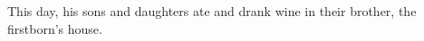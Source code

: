 \begin{inparaenum}
     This day, his sons and daughters ate and drank wine in their brother, the firstborn's house.%
     \smallskip%
    
    \pvba{}%
    
    \pvba{}%
    
    {\noindent{} \smallskip}%
    
    \pvbb{}{}%
    
    \pvba{}%
    
    \pvba{}%
    
    {\noindent{} \smallskip}%
    
    \pvbb{}{}%
    
    
    \pvbb{}{}%
    
    \pvba{}%
    
    {\noindent{} \smallskip}%
    
    \pveb{}{}%
    \pveb{}{}%
    
    {\noindent{} }%
\end{inparaenum}
